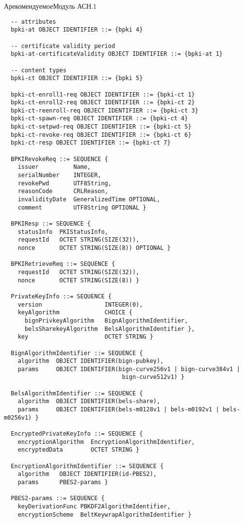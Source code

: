 \begin{appendix}{А}{рекомендуемое}{Модуль АСН.1}
\begin{verbatim}
  -- attributes
  bpki-at OBJECT IDENTIFIER ::= {bpki 4}

  -- certificate validity period
  bpki-at-certificateValidity OBJECT IDENTIFIER ::= {bpki-at 1}

  -- content types
  bpki-сt OBJECT IDENTIFIER ::= {bpki 5}

  bpki-ct-enroll1-req OBJECT IDENTIFIER ::= {bpki-ct 1}
  bpki-ct-enroll2-req OBJECT IDENTIFIER ::= {bpki-ct 2}
  bpki-ct-reenroll-req OBJECT IDENTIFIER ::= {bpki-ct 3}
  bpki-ct-spawn-req OBJECT IDENTIFIER ::= {bpki-ct 4}
  bpki-ct-setpwd-req OBJECT IDENTIFIER ::= {bpki-ct 5}
  bpki-ct-revoke-req OBJECT IDENTIFIER ::= {bpki-ct 6}
  bpki-ct-resp OBJECT IDENTIFIER ::= {bpki-ct 7}

  BPKIRevokeReq ::= SEQUENCE {
    issuer          Name,
    serialNumber    INTEGER,
    revokePwd       UTF8String,
    reasonCode      CRLReason,
    invalidityDate  GeneralizedTime OPTIONAL,
    comment         UTF8String OPTIONAL }

  BPKIResp ::= SEQUENCE { 
    statusInfo  PKIStatusInfo,
    requestId   OCTET STRING(SIZE(32)),
    nonce       OCTET STRING(SIZE(8)) OPTIONAL }

  BPKIRetrieveReq ::= SEQUENCE {
    requestId   OCTET STRING(SIZE(32)),
    nonce       OCTET STRING(SIZE(8)) }

  PrivateKeyInfo ::= SEQUENCE {
    version                  INTEGER(0),
    keyAlgorithm             CHOICE {
      bignPrivkeyAlgorithm   BignAlgorithmIdentifier,
      belsSharekeyAlgorithm  BelsAlgorithmIdentifier },
    key                      OCTET STRING }
  
  BignAlgorithmIdentifier ::= SEQUENCE {
    algorithm  OBJECT IDENTIFIER(bign-pubkey),
    params     OBJECT IDENTIFIER(bign-curve256v1 | bign-curve384v1 | 
                                  bign-curve512v1) }
  
  BelsAlgorithmIdentifier ::= SEQUENCE {
    algorithm  OBJECT IDENTIFIER(bels-share),
    params     OBJECT IDENTIFIER(bels-m0128v1 | bels-m0192v1 | bels-m0256v1) }

  EncryptedPrivateKeyInfo ::= SEQUENCE {
    encryptionAlgorithm  EncryptionAlgorithmIdentifier,
    encryptedData        OCTET STRING }
  
  EncryptionAlgorithmIdentifier ::= SEQUENCE {
    algorithm   OBJECT IDENTIFIER(id-PBES2),
    params      PBES2-params }
  
  PBES2-params ::= SEQUENCE {
    keyDerivationFunc PBKDF2AlgorithmIdentifier,
    encryptionScheme  BeltKeywrapAlgorithmIdentifier }
  

\end{verbatim}
\end{appendix}
